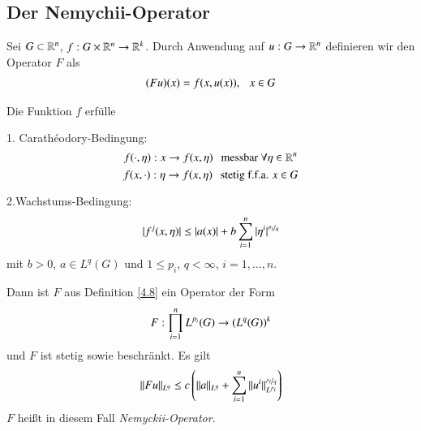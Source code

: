 \subsection{Der Nemychii-Operator}

\begin{defi}\label{4.8}
    Sei $G\subset \mathbb{R}^n$, $f:G\times \mathbb{R}^n\rightarrow \mathbb{R}^k$. Durch Anwendung auf $u:G\rightarrow \mathbb{R}^n$ definieren
    wir den Operator $F$ als
    \begin{align}
        (Fu)(x)=f(x,u(x)), \hspace{.25cm} x\in G
    \end{align}
\end{defi}

\begin{lem}\label{4.9}
    Die Funktion $f$ erfülle
    \begin{description}
        \item{1. Carathéodory-Bedingung:}
        \[
            f(\cdot,\eta): x \rightarrow f(x,\eta) \hspace{.25cm} \text{messbar } \forall \eta\in \mathbb{R}^n
        \]
        \[
            f(x,\cdot):\eta\rightarrow f(x,\eta) \hspace{.25cm} \text{stetig f.f.a. } x\in G
        \]
        \item{2.Wachstums-Bedingung:}
        \[
            |f^j(x,\eta)|\leq |a(x)|+ b \sum_{i=1}^n|\eta^i|^{\nicefrac{p_i}{q}}
        \]
        mit $b>0$, $a\in L^q(G)$ und $1\leq p_i$, $q<\infty$, $i=1,…,n$. 
    \end{description}
    Dann ist $F$ aus Definition \ref{4.8} ein Operator der Form
    \[
        F:\prod_{i=1}^n L^{p_i}(G) \rightarrow (L^q(G))^k
    \]
    und $F$ ist stetig sowie beschränkt. Es gilt
    \[
        \|Fu\|_{L^q}\leq c\left( \|a\|_{L^q} + \sum_{i=1}^n \|u^i\|_{L^{p_i}}^{\nicefrac{p_i}{q}} \right)
    \]
    $F$ heißt in diesem Fall \textit{Nemyckii-Operator}.
\end{lem}

